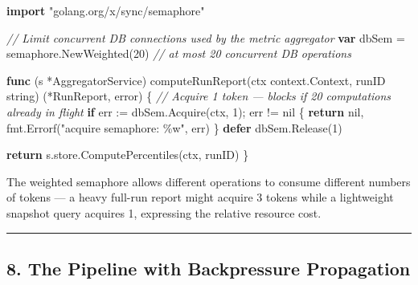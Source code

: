 \documentclass[
]{article}
\newenvironment{Shaded}{}{}
\newcommand{\CommentTok}[1]{\textcolor[rgb]{0.38,0.63,0.69}{\textit{#1}}}
\newcommand{\ControlFlowTok}[1]{\textcolor[rgb]{0.00,0.44,0.13}{\textbf{#1}}}
\newcommand{\DataTypeTok}[1]{\textcolor[rgb]{0.56,0.13,0.00}{#1}}
\newcommand{\DecValTok}[1]{\textcolor[rgb]{0.25,0.63,0.44}{#1}}
\newcommand{\KeywordTok}[1]{\textcolor[rgb]{0.00,0.44,0.13}{\textbf{#1}}}
\newcommand{\NormalTok}[1]{#1}
\newcommand{\OperatorTok}[1]{\textcolor[rgb]{0.40,0.40,0.40}{#1}}
\newcommand{\OtherTok}[1]{\textcolor[rgb]{0.00,0.44,0.13}{#1}}
\newcommand{\StringTok}[1]{\textcolor[rgb]{0.25,0.44,0.63}{#1}}
\begin{document}
\begin{Shaded}
\begin{Highlighting}[]
\KeywordTok{import} \StringTok{"golang.org/x/sync/semaphore"}

\CommentTok{// Limit concurrent DB connections used by the metric aggregator}
\KeywordTok{var}\NormalTok{ dbSem }\OperatorTok{=}\NormalTok{ semaphore}\OperatorTok{.}\NormalTok{NewWeighted}\OperatorTok{(}\DecValTok{20}\OperatorTok{)} \CommentTok{// at most 20 concurrent DB operations}

\KeywordTok{func} \OperatorTok{(}\NormalTok{s }\OperatorTok{*}\NormalTok{AggregatorService}\OperatorTok{)}\NormalTok{ computeRunReport}\OperatorTok{(}\NormalTok{ctx context}\OperatorTok{.}\NormalTok{Context}\OperatorTok{,}\NormalTok{ runID }\DataTypeTok{string}\OperatorTok{)} \OperatorTok{(*}\NormalTok{RunReport}\OperatorTok{,} \DataTypeTok{error}\OperatorTok{)} \OperatorTok{\{}
    \CommentTok{// Acquire 1 token — blocks if 20 computations already in flight}
    \ControlFlowTok{if}\NormalTok{ err }\OperatorTok{:=}\NormalTok{ dbSem}\OperatorTok{.}\NormalTok{Acquire}\OperatorTok{(}\NormalTok{ctx}\OperatorTok{,} \DecValTok{1}\OperatorTok{);}\NormalTok{ err }\OperatorTok{!=} \OtherTok{nil} \OperatorTok{\{}
        \ControlFlowTok{return} \OtherTok{nil}\OperatorTok{,}\NormalTok{ fmt}\OperatorTok{.}\NormalTok{Errorf}\OperatorTok{(}\StringTok{"acquire semaphore: \%w"}\OperatorTok{,}\NormalTok{ err}\OperatorTok{)}
    \OperatorTok{\}}
    \ControlFlowTok{defer}\NormalTok{ dbSem}\OperatorTok{.}\NormalTok{Release}\OperatorTok{(}\DecValTok{1}\OperatorTok{)}

    \ControlFlowTok{return}\NormalTok{ s}\OperatorTok{.}\NormalTok{store}\OperatorTok{.}\NormalTok{ComputePercentiles}\OperatorTok{(}\NormalTok{ctx}\OperatorTok{,}\NormalTok{ runID}\OperatorTok{)}
\OperatorTok{\}}
\end{Highlighting}
\end{Shaded}

The weighted semaphore allows different operations to consume different
numbers of tokens --- a heavy full-run report might acquire 3 tokens
while a lightweight snapshot query acquires 1, expressing the relative
resource cost.

\begin{center}\rule{0.5\linewidth}{0.5pt}\end{center}

\hypertarget{the-pipeline-with-backpressure-propagation}{%
\subsection{8. The Pipeline with Backpressure
Propagation}\label{the-pipeline-with-backpressure-propagation}}
\end{document}
